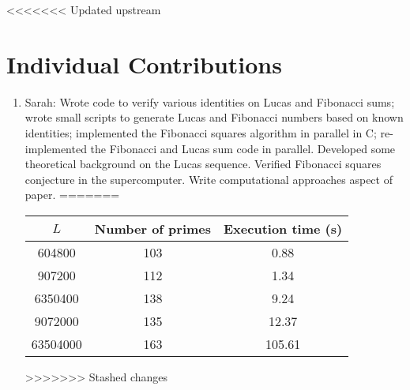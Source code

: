 \documentclass[11pt]{article}
\begin{document}
<<<<<<< Updated upstream
\section{Individual Contributions}

\begin{enumerate}
\item Sarah: Wrote code to verify various identities on Lucas and Fibonacci sums; wrote small scripts to generate Lucas and Fibonacci numbers based on known identities; implemented the Fibonacci squares algorithm in parallel in C; re-implemented the Fibonacci and Lucas sum code in parallel. Developed some theoretical background on the Lucas sequence. Verified Fibonacci squares conjecture in the supercomputer. Write computational approaches aspect of paper.
=======
\begin{tabular}{ccc}
\hline
$L$ & Number of primes & Execution time (s) \\ \hline
604800 & 103 & 0.88 \\
907200 & 112 & 1.34 \\
6350400 & 138 & 9.24 \\
9072000 & 135 & 12.37 \\
63504000 & 163 & 105.61 \\ \hline \hline
\end{tabular}
>>>>>>> Stashed changes



\end{enumerate}
\end{document}
